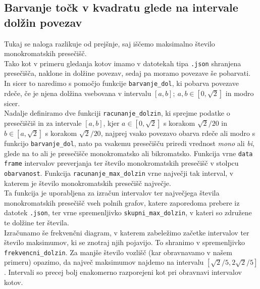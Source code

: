 \documentclass[12pt, a4paper]{article}
\begin{document}
	\subsection{Barvanje točk v kvadratu glede na intervale dolžin povezav}
	Tukaj se naloga razlikuje od prejšnje, saj iščemo maksimalno število monokromatskih presečišč. \\
	Tako kot v primeru gledanja kotov imamo v datotekah tipa \texttt{.json} shranjena presečišča, naklone in dolžine povezav, sedaj pa moramo povezave še pobarvati. In sicer to naredimo s pomočjo funkcije \texttt{barvanje\_dol}, ki pobarva povezave rdeče, če je njena dolžina vsebovana v intervalu $\left[{a,b}\right]; \ a,b \in \left[{0,\sqrt{2}}\right]$ in modro sicer. \\
	Nadalje definiramo dve funkciji \texttt{racunanje\_dolzin}, ki sprejme podatke o presečiščiš in za intervale $\left[{a,b}\right]$, kjer $a \in \left[{0, \sqrt{2}}\right]$ s korakom $\sqrt{2}/20$ in $b \in \left[{a, \sqrt{2}}\right]$ s korakom $\sqrt{2}/20$, najprej vsako povezavo obarva rdeče ali modro s funkcijo \texttt{barvanje\_dol}, nato pa vsakemu presečišču priredi vrednost \textit{mono} ali \textit{bi}, glede na to ali je presečišče monokromatsko ali bikromatsko. Funkcija vrne \texttt{data frame} intervalov preverjanja ter število monokromatskih presečišč v stolpcu \texttt{obarvanost}. Funkcija \texttt{racunanje\_max\_dolzin} vrne največji tak interval, v katerem je število monokromatskih presečišč največje. \\
	Ta funkcija je uporabljena za izračun intervalov ter največjega števila monokromatskih presečišč vseh polnih grafov, katere zaporedoma prebere iz datotek \texttt{.json}, ter vrne spremenljivko \texttt{skupni\_max\_dolzin}, v kateri so združene te dolžine ter števila. \\
	Izračunamo še frekvenčni diagram, v katerem zabeležimo začetke intervalov ter število maksimumov, ki se znotraj njih pojavijo. To shranimo v spremenljivko \texttt{frekvencni\_dolzin}. Za manjše število vozlišč (kar obravnavamo v našem primeru) opazimo, da največ maksimumov najdemo na intervalu $\left[{\sqrt{2}/5, 2\sqrt{2}/5}\right]$. Intervali so precej bolj enakomerno razporejeni kot pri obravnavi intervalov kotov.
\end{document}
